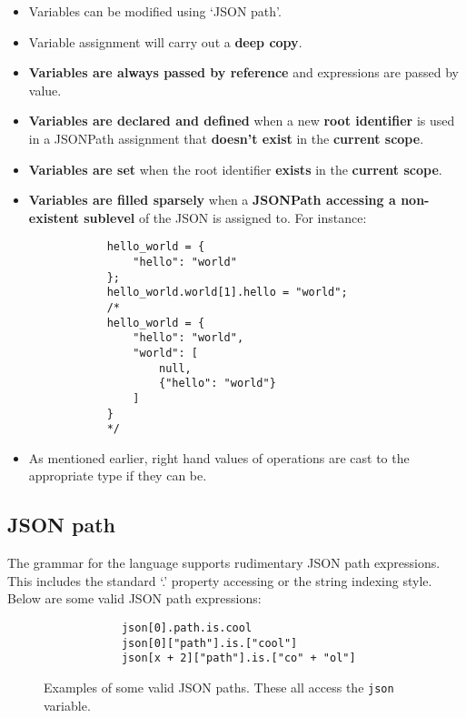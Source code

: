 \documentclass[12pt, letterpaper]{article}
\begin{document}
\begin{center}
    \begin{itemize}
        \item Variables can be modified using `JSON path'.
        \item Variable assignment will carry out a \textbf{deep copy}.
        \item \textbf{Variables are always passed by reference} and expressions are passed by value.
        \item \textbf{Variables are declared and defined} when a new \textbf{root identifier} is used in a JSONPath assignment that \textbf{doesn't exist} in the \textbf{current scope}.
        \item \textbf{Variables are set} when the root identifier \textbf{exists} in the \textbf{current scope}.
        \item \textbf{Variables are filled sparsely} when a \textbf{JSONPath accessing a non-existent sublevel} of the JSON is assigned to. For instance:
        \begin{verbatim}
            hello_world = {
                "hello": "world"
            };
            hello_world.world[1].hello = "world";
            /*
            hello_world = {
                "hello": "world",
                "world": [
                    null,
                    {"hello": "world"}
                ]
            }
            */
        \end{verbatim}
        \item As mentioned earlier, right hand values of operations are cast to the appropriate type if they can be. 
    \end{itemize}
\end{center}

\subsection{JSON path}

The grammar for the language supports rudimentary JSON path expressions. This includes the standard `.' property accessing or the string indexing style. Below are some valid JSON path expressions:

\begin{figure}[H]
    \begin{center}
        \begin{verbatim}
            json[0].path.is.cool
            json[0]["path"].is.["cool"]
            json[x + 2]["path"].is.["co" + "ol"]
        \end{verbatim}
    \end{center}
    \vspace{-1.5em}
    \cprotect\caption{Examples of some valid JSON paths. These all access the \verb|json| variable.}
\end{figure}
\end{document}
